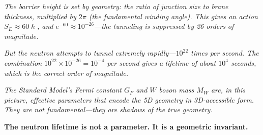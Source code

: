 \documentclass[11pt,a4paper]{article}
\newcommand{\hbar}{\hslash}
\begin{document}
\noindent\textit{The barrier height is set by geometry: the ratio of junction size to brane thickness, multiplied by $2\pi$ (the fundamental winding angle). This gives an action $S_E \approx 60\hbar$, and $e^{-60} \approx 10^{-26}$---the tunneling is suppressed by 26 orders of magnitude.}

\noindent\textit{But the neutron attempts to tunnel extremely rapidly---$10^{22}$ times per second. The combination $10^{22} \times 10^{-26} = 10^{-4}$ per second gives a lifetime of about $10^4$ seconds, which is the correct order of magnitude.}

\noindent\textit{The Standard Model's Fermi constant $G_F$ and $W$ boson mass $M_W$ are, in this picture, effective parameters that encode the 5D geometry in 3D-accessible form. They are not fundamental---they are shadows of the true geometry.}

\vspace{1em}
\begin{center}
\textbf{The neutron lifetime is not a parameter. It is a geometric invariant.}
\end{center}
\end{document}
